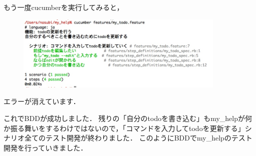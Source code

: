 もう一度cucumberを実行してみると，

\begin{figure}[htbp]\begin{center}
\includegraphics[width=10cm,bb= 0 0 737 553]{../figs/./cucumber4.jpg}
\caption{}
\label{default}\end{center}\end{figure}
エラーが消えています．

これでBDDが成功しました．
残りの「自分のtodoを書き込む」もmy\_helpが何か振る舞いをするわけではないので，「コマンドを入力してtodoを更新する」シナリオ全てのテスト開発が終わりました．
このようにBDDでmy\_helpのテスト開発を行っていきました．

